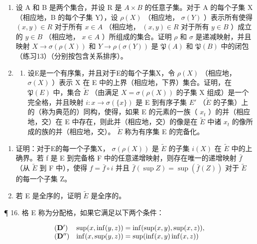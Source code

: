 \begin{enumerate}
\def\labelenumi{\arabic{enumi}.}
\setcounter{enumi}{13}
\item
  设 A 和 B 是两个集合，并设 R 是 \(A \times B\) 的任意子集。对于 A 的每个子集 X（相应地，B 的每个子集 Y），设 \(\rho(X)\) （相应地， \(\sigma(Y)\) ）表示所有使得 \((x, y) \in R\) 对于所有 \(x \in A\) （相应地， \((x, y) \in R\) 对于所有 \(y \in B\) ）成立的 \(y \in B\) （相应地， \(x \in A\) ）所组成的集合。证明 \(\rho\) 和 \(\sigma\) 是递减映射，并且映射 \(X \to \sigma(\rho(X))\) 和 \(Y \to \rho(\sigma(Y))\) 是 \(\mathfrak{P}(A)\) 和 \(\mathfrak{P}(B)\) 中的闭包（练习13）（分别按包含关系排序）。
\item
  \begin{enumerate}
  \def\labelenumii{(\alph{enumii})}
  \tightlist
  \item
    设E是一个有序集，并且对于E的每个子集X，令 \(\rho(X)\) （相应地， \(\sigma(X)\) ）表示 X 在 E 中的上界（相应地，下界）集合。证明，在 \(\mathfrak{P}(E)\) 中，集合 \(\tilde{E}\) （由满足 \(X = \sigma(\rho(X))\) 的子集 X 组成）是一个完全格，并且映射 \(i: x \to \sigma(\{x\})\) 是 E 到有序子集 \(E'\) （\(\tilde{E}\) 的子集）上的（称为典范的）同构，使得，如果 E 的元素的一族（ \(x_t\) ）的并（相应地，交）在 E 中存在，则此并（相应地，交）的像是在 \(\tilde{E}\) 中诸 \(x_t\) 的像所成的族的并（相应地，交）。 \(\tilde{E}\) 称为有序集 E 的完备化。
  \end{enumerate}
\end{enumerate}

\begin{enumerate}
\def\labelenumi{(\alph{enumi})}
\setcounter{enumi}{1}
\item
  证明：对于E的每一个子集X， \(\sigma(\rho(X))\) 是 \(\tilde{E}\) 的子集 \(i(X)\) 在 \(\tilde{E}\) 中的上确界。若 f 是 E 到完备格 F 中的任意递增映射，则存在唯一的递增映射 \(\bar{f}\) （从 \(\tilde{E}\) 到 F 中），使得 \(f = \bar{f} \circ i\) 并且 \(\bar{f}(\sup Z) = \sup (\bar{f}(Z))\) 对于 \(\tilde{E}\) 的每一个子集 Z。
\item
  若 E 是全序的，证明 \(\tilde{E}\) 是全序的。
\end{enumerate}

¶ 16. 格 E 称为分配格，如果它满足以下两个条件：

\[
\begin{array}{l l} \left(\mathbf {D} ^ {\prime}\right) & \sup (x, \inf (y, z)) = \inf (\sup (x, y), \sup (x, z)), \\ \left(\mathbf {D} ^ {\prime \prime}\right) & \inf (x, \sup (y, z)) = \sup (\inf (x, y) \inf (x, z)) \end{array}
\]

